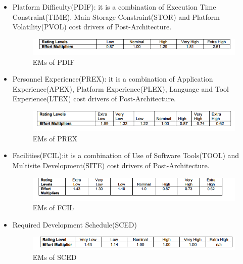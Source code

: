 \begin{itemize}
\begin{itemize}[label = {-}]
\item Platform Difficulty(PDIF): it is a combination of Execution Time Constraint(TIME), Main Storage Constraint(STOR) and Platform Volatility(PVOL) cost drivers of Post-Architecture. 
\begin{figure}[H]	
	\centering
	\includegraphics[scale = 0.6]{img/PDIF.png}
	\caption{EMs of PDIF}
\end{figure}

\item Personnel Experience(PREX): it is a combination of Application Experience(APEX), Platform Experience(PLEX), Language and Tool Experience(LTEX) cost drivers of Post-Architecture. 
\begin{figure}[H]	
	\centering
	\includegraphics[scale = 0.6]{img/PREX.png}
	\caption{EMs of PREX}
\end{figure}

\item Facilities(FCIL):it is a combination of Use of Software Tools(TOOL) and Multisite Development(SITE) cost drivers of Post-Architecture. 

\begin{figure}[H]	
	\centering
	\includegraphics[scale = 0.6]{img/FCIL.png}
	\caption{EMs of FCIL}
\end{figure}

\item Required Development Schedule(SCED)

\begin{figure}[H]	
	\centering
	\includegraphics[scale = 0.6]{img/SCED.png}
	\caption{EMs of SCED}
\end{figure}

\end{itemize} 
\end{itemize}


